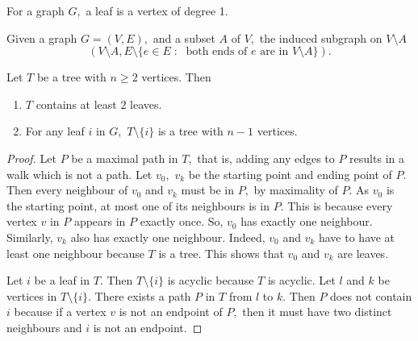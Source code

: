 \begin{definition}[Leaf]
	For a graph $G,$ a leaf is a vertex of degree 1.
\end{definition}
Given a graph $G = (V, E),$ and a subset $A$ of $V,$ the induced 
subgraph on $V \setminus A$ 
$$ \left( V \setminus A, E \setminus \{e \in E \; : \; 
\text{ both ends of } e \text{ are in } V\setminus A \} \right).$$
\begin{lemma}
	Let $T$ be a tree with $n \geq 2$ vertices. Then
\begin{enumerate}
	\item $T$ contains at least $2$ leaves.
	\item For any leaf $i$ in $G,$ $T \setminus \{i\}$ is a tree
		with $n-1$ vertices.
\end{enumerate}
\end{lemma}
\begin{proof}
	Let $P$ be a maximal path in $T,$ that is, adding any edges
	to $P$ results in a walk which is not a path. Let $v_0,$ 
	$v_k$ be the starting point and ending point of $P.$ Then
	every neighbour of $v_0$ and $v_k$ must be in $P,$ by
	maximality of $P.$ As $v_0$ is the starting point, at most
	one of its neighbours is in $P.$ This is because every vertex
	$v$ in $P$ appears in $P$ exactly once. So, $v_0$ has exactly
	one neighbour. Similarly, $v_k$ also has exactly one neighbour.
	Indeed, $v_0$ and $v_k$ have to have at least one neighbour
	because $T$ is a tree. This shows that $v_0$ and $v_k$ are
	leaves.

Let $i$ be a leaf in $T.$ Then $T \setminus \{i\}$ is acyclic because
$T$ is acyclic. Let $l$ and $k$ be vertices in $T \setminus \{i\}.$
There exists a path $P$ in $T$ from $l$ to $k.$ Then $P$ does not
contain $i$ because if a vertex $v$ is not an endpoint of $P,$ then
it must have two distinct neighbours and $i$ is not an endpoint.
\end{proof}

